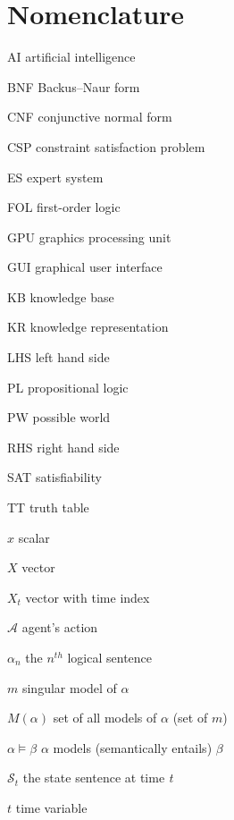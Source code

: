 \chapter{Nomenclature}
\label{nomenclature}

\begin{Nomencl}[4em]
	
	\item[AI] artificial intelligence
	\item[BNF] Backus–Naur form  
	\item[CNF] conjunctive normal form
	\item[CSP] constraint satisfaction problem
	\item[ES] expert system 	
	\item[FOL] first-order logic
	\item[GPU] graphics processing unit
	\item[GUI] graphical user interface
    \item[KB] knowledge base
    \item[KR] knowledge representation
    \item[LHS] left hand side
    \item[PL] propositional logic
    \item[PW] possible world
    \item[RHS] right hand side
    \item[SAT] satisfiability
    \item[TT] truth table
    
   
	\item[$x$] scalar
	\item[${X}$] vector
   	\item[${X}_t$] vector with time index 



   
  	 \item[$\mathcal{A}$] agent's action
   	\item[$\alpha_n$]  the $n^{th}$ logical sentence
   	\item[$m$] singular model of $\alpha$ 
   	\item[$M(\alpha)$]  set of all models of $\alpha$ (set of $m$)
   	\item[$\alpha \models \beta$]  $\alpha$ models (semantically entails) $\beta$
   	\item[$\mathcal{S}_t$] the state sentence at time \textit{t}
   	\item[$t$] time variable



\end{Nomencl}


\endinput
